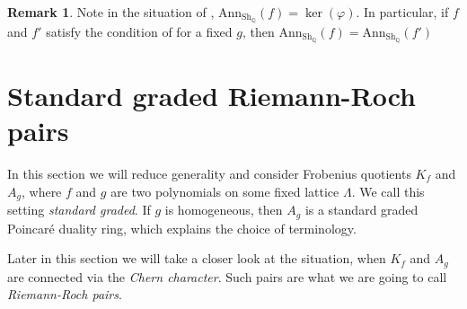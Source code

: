\documentclass[oneside]{amsart}
\theoremstyle{plain}
\theoremstyle{definition}
\newtheorem{remark}[theorem]{Remark}
\newcommand{\Q}{{\mathbb{Q}}}
\newcommand{\Ann}{{\mathrm{Ann}}}
\newcommand{\Sh}{{\mathrm{Sh}}}
\begin{document}
\begin{remark}
    Note in the situation of ,
    $\Ann_{\Sh_\Q}(f) = \ker(\varphi)$. In particular, if $f$ and $f'$ satisfy the condition of 
     for a fixed $g$, then $\Ann_{\Sh_\Q}(f) = \Ann_{\Sh_\Q}(f')$
\end{remark}






\section{Standard graded Riemann-Roch pairs}
\label{sec:standard}

In this section we will reduce generality and consider Frobenius quotients $K_f$ and $A_g$, where $f$ and $g$ are two polynomials on some fixed lattice $\Lambda$.
We call this setting \emph{standard graded}. If $g$ is homogeneous, then $A_g$ is a standard graded Poincar\'e duality ring, which explains the choice of terminology.

Later in this section we will take a closer look at the situation, when $K_f$ and $A_g$ are connected via the \emph{Chern character}. Such pairs are what we are going to call \emph{Riemann-Roch pairs}.
\end{document}
